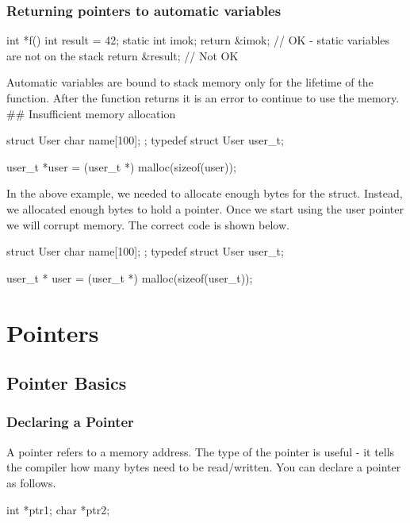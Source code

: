 \subsubsection{Returning pointers to automatic variables}

\begin{code}[language=C]
int *f() {
    int result = 42;
    static int imok;
    return &imok; // OK - static variables are not on the stack
    return &result; // Not OK
}
\end{code}

Automatic variables are bound to stack memory only for the lifetime of
the function. After the function returns it is an error to continue to
use the memory. \#\# Insufficient memory allocation

\begin{code}[language=C]
struct User {
   char name[100];
};
typedef struct User user_t;

user_t *user = (user_t *) malloc(sizeof(user));
\end{code}

In the above example, we needed to allocate enough bytes for the struct.
Instead, we allocated enough bytes to hold a pointer. Once we start
using the user pointer we will corrupt memory. The correct code is shown
below.

\begin{code}[language=C]
struct User {
   char name[100];
};
typedef struct User user_t;

user_t * user = (user_t *) malloc(sizeof(user_t));
\end{code}


\section{Pointers}

\subsection{Pointer Basics}

\subsubsection{Declaring a Pointer}

A pointer refers to a memory address. The type of the pointer is useful
- it tells the compiler how many bytes need to be read/written. You can
declare a pointer as follows.

\begin{code}[language=C]
int *ptr1;
char *ptr2;
\end{code}

